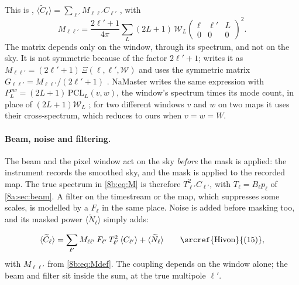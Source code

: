 This is , $\langle\widetilde C_\ell\rangle=\sum_{\ell'}M_{\ell\ell'}C_{\ell'}$
, with
\begin{equation}
  M_{\ell\ell'}=\frac{2\ell'+1}{4\pi}\sum_L(2L+1)\,\mathcal W_L\begin{pmatrix}\ell&\ell'&L\\0&0&0\end{pmatrix}^2 .
  \label{8b:eq:Mdef}
\end{equation}
The matrix depends only on the window, through its spectrum, and not on the sky. It is not
symmetric because of the factor $2\ell'+1$; \textcite{Efstathiou2004} writes it as
$M_{\ell\ell'}=(2\ell'+1)\,\Xi(\ell,\ell',\mathcal W)$ and uses the symmetric matrix
$G_{\ell\ell'}=M_{\ell\ell'}/(2\ell'+1)$ \cite[eqs~9--11]{Efstathiou2004}. NaMaster writes the same
expression with $P^{vw}_{L}=(2L+1)\,\mathrm{PCL}_L(v,w)$, the window's spectrum times its mode count,
in place of $(2L+1)\mathcal W_L$ \cite[eq.~12]{Alonso2019}; for two different windows $v$ and $w$
on two maps it uses their cross-spectrum, which reduces to ours when $v=w=W$.

\paragraph{Beam, noise and filtering.}
The beam and the pixel window act on the sky \emph{before} the mask is applied: the
instrument records the smoothed sky, and the mask is applied to the recorded map. The true spectrum
in \eqref{8b:eq:M} is therefore $T_{\ell'}^2C_{\ell'}$, with $T_\ell=B_\ell p_\ell$ of \cref{8a:sec:beam}.
A filter on the timestream or the map, which suppresses some scales, is modelled by a
 $F_\ell$ in the same place. Noise is added before masking too, and
its masked power $\langle\widetilde N_\ell\rangle$ simply adds:

\begin{keyidea}
\[
  \langle\widetilde C_\ell\rangle=\sum_{\ell'}M_{\ell\ell'}\,F_{\ell'}\,T_{\ell'}^2\,\langle C_{\ell'}\rangle
  +\langle\widetilde N_\ell\rangle
  \qquad\text{\srcref{Hivon}{(15)}},
\]
with $M_{\ell\ell'}$ from \eqref{8b:eq:Mdef}. The coupling depends on the window alone; the beam and
filter sit inside the sum, at the true multipole $\ell'$.
\end{keyidea}

